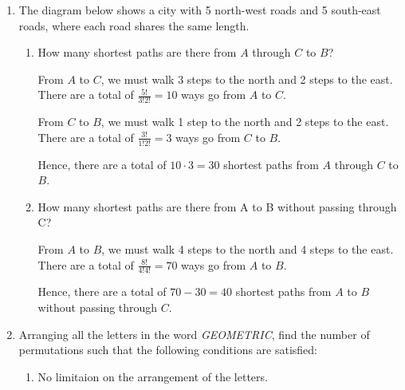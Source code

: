 \documentclass{report}
\begin{document}
\begin{multicols}{2}
\begin{enumerate}
    \item The diagram below shows a city with 5 north-west roads and 5 south-east roads,
          where each road shares the same length.
          \begin{center}
          \end{center}
          \begin{enumerate}
            \item How many shortest paths are there from $A$ through $C$ to $B$? \sol{}

                  From $A$ to $C$, we must walk 3 steps to the north and 2 steps to the east.
                  There are a total of $\frac{5!}{3!2!} = 10$ ways go from $A$ to $C$.

                  From $C$ to $B$, we must walk 1 step to the north and 2 steps to the east.
                  There are a total of $\frac{3!}{1!2!} = 3$ ways go from $C$ to $B$.

                  Hence, there are a total of $10 \cdot 3 = 30$ shortest paths from $A$ through
                  $C$ to $B$.

            \item How many shortest paths are there from A to B without passing through C? \sol{}

                  From $A$ to $B$, we must walk 4 steps to the north and 4 steps to the east.
                  There are a total of $\frac{8!}{4!4!} = 70$ ways go from $A$ to $B$.

                  Hence, there are a total of $70 - 30 = 40$ shortest paths from $A$ to $B$
                  without passing through $C$.
          \end{enumerate}

    \item Arranging all the letters in the word \textit{GEOMETRIC}, find the number of
          permutations such that the following conditions are satisfied:
          \begin{enumerate}
            \item No limitaion on the arrangement of the letters. \sol{}


\end{enumerate}
\end{enumerate}
\end{multicols}
\end{document}
